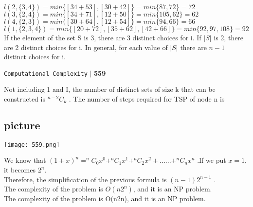 \documentclass[11pt]{article}
\begin{document}
\hspace*{1.5cm} $l(2, \{3, 4\}) = min\{[34 + 53], [30 + 42]\} = min\{87, 72\} = 72$ \\
\hspace*{1.5cm} $l(3, \{2, 4\}) = min\{[34 + 71], [12 + 50]\} = min\{105, 62\} = 62$ \\
\hspace*{1.5cm} $l(4, \{2, 3\}) = min\{[30 + 64], [12 + 54]\} = min \{94, 66\} = 66$ \\

\vspace*{0.2cm}
\hspace*{0.5cm} $l(1, \{2, 3, 4\}) = min\{[20 + 72], [35 + 62], [42 + 66]\} = min\{92, 97, 108\} = 92$ \\

\vspace*{0.3cm}
\hspace*{0.5cm} If the element of the set S is 3, there are 3 distinct choices for i. If $| S |$ is 2, there are 2 distinct choices
for i. In general, for each value of $| S |$ there are $n - 1$ distinct choices for i.\\

\newpage
\begin{flushright}
 \texttt{Computational Complexity} \hspace*{0.10cm}\textbf{$|$} \textbf{559}\hspace*{0.5cm}
\end{flushright}
\vspace*{0.5cm}

\hspace*{0.5cm} Not including 1 and I, the number of distinct sets of size k that can be constructed is $^{n - 2}C _{k}$ . The number of steps required for TSP of node n is\\

\begin{center}
\section{picture}
\texttt{[image: 559.png]}
\end{center}

\hspace*{0.5cm} We know that $(1+x) ^{n} = ^{n} C _{0} x ^{0} + ^{n} C _{1} x ^{1} + ^{n} C _{2} x ^{2} + ...... + ^{n} C _{n} x ^{n}$ .If we put $x = 1$, it becomes $2 ^{n}$. \\
Therefore, the simplification of the previous formula is $(n-1)2 ^{n-1}$ .\\
\hspace*{0.5cm} The complexity of the problem is $O(n2 ^{n})$, and it is an NP problem.\\
The complexity of the problem is O(n2n), and it is an NP problem.\\
\end{document}
